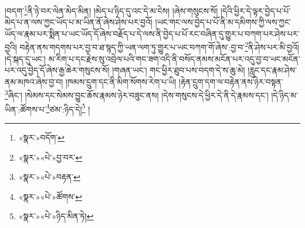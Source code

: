 །བདག་\footnote{«སྣར་»བདོག་}ནི་ཉེ་བར་ལེན་མེད་མིན། །མེད་པ་ཉིད་དུ་འང་དེ་མ་ངེས། །ཞེས་གསུངས་སོ། །དེའི་ཕྱིར་དེ་ལྟར་བྱེད་པ་པོ་མེད་པ་ན་ལས་ཀྱང་ཡོད་པ་མ་ཡིན་ནོ་ཞེས་ཤེས་པར་བྱའོ། །ཡང་གང་ལས་བྱེད་པ་པོ་ནི་མ་དམིགས་ཀྱི་ལས་ཀྱང་ཡོད་ལ་རྣམ་པར་སྨིན་པ་ཡང་ཡོད་དོ་ཞེས་བརྗོད་པ་དེ་ལས་ནི་བྱེད་པ་པོ་རང་བཞིན་དུ་གྱུར་པ་བཀག་པར་ཤེས་པར་བྱའི། བརྟེན་ནས་གདགས་པར་བྱ་བ་ཐ་སྙད་ཀྱི་ཡན་ལག་ཏུ་གྱུར་པ་ཡང་བཀག་གོ་ཞེས་:བྱ་བ་\footnote{«སྣར་»«པེ་»བྱ་བར་}ནི་ཤེས་པར་མི་བྱའོ། །དེ་སྐད་དུ་ཡང་། མ་རིག་པ་དང་རྗེས་སུ་འབྲེལ་པའི་གང་ཟག་འདི་ནི་བསོད་ནམས་མངོན་པར་འདུ་བྱ་བ་ཡང་མངོན་པར་འདུ་བྱེད་དོ་ཞེས་རྒྱ་ཆེར་གསུངས་སོ། །གཞན་ཡང་། གང་ཕྱིར་ཐུབ་པས་བདག་དེ་ས་ཆུ་མེ། །རླུང་དང་རྣམ་ཤེས་ནམ་མཁའ་ཞེས་བྱ་བ། །ཁམས་དྲུག་དང་ནི་མིག་སོགས་རེག་པ་ཡི། །རྟེན་དྲུག་དག་ལ་བརྟེན་ནས་ཉེར་བསྟན་\footnote{«སྣར་»«པེ་»བརྟན་}ཞིང་། །སེམས་དང་སེམས་བྱུང་ཆོས་རྣམས་ཉེར་བཟུང་ནས། །དེས་གསུངས་དེ་ཕྱིར་དེ་ནི་དེ་རྣམས་དང་། །དེ་ཉིད་མ་ཡིན་:ཚོགས་པ་\footnote{«སྣར་»«པེ་»ཚོགས་}ཙམ་:ཉིད་དེ།\footnote{«སྣར་»«པེ་»ཉིད་མིན་ཏེ།} །
